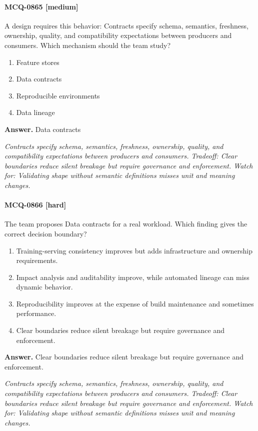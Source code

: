 \paragraph{MCQ-0865 [medium]} A design requires this behavior: Contracts specify schema, semantics, freshness, ownership, quality, and compatibility expectations between producers and consumers. Which mechanism should the team study?
\begin{enumerate}[label=\Alph*.]
\item Feature stores
\item Data contracts
\item Reproducible environments
\item Data lineage
\end{enumerate}
\noindent\textbf{Answer.} Data contracts
\par\textit{Contracts specify schema, semantics, freshness, ownership, quality, and compatibility expectations between producers and consumers. Tradeoff: Clear boundaries reduce silent breakage but require governance and enforcement. Watch for: Validating shape without semantic definitions misses unit and meaning changes.}
\paragraph{MCQ-0866 [hard]} The team proposes Data contracts for a real workload. Which finding gives the correct decision boundary?
\begin{enumerate}[label=\Alph*.]
\item Training-serving consistency improves but adds infrastructure and ownership requirements.
\item Impact analysis and auditability improve, while automated lineage can miss dynamic behavior.
\item Reproducibility improves at the expense of build maintenance and sometimes performance.
\item Clear boundaries reduce silent breakage but require governance and enforcement.
\end{enumerate}
\noindent\textbf{Answer.} Clear boundaries reduce silent breakage but require governance and enforcement.
\par\textit{Contracts specify schema, semantics, freshness, ownership, quality, and compatibility expectations between producers and consumers. Tradeoff: Clear boundaries reduce silent breakage but require governance and enforcement. Watch for: Validating shape without semantic definitions misses unit and meaning changes.}
